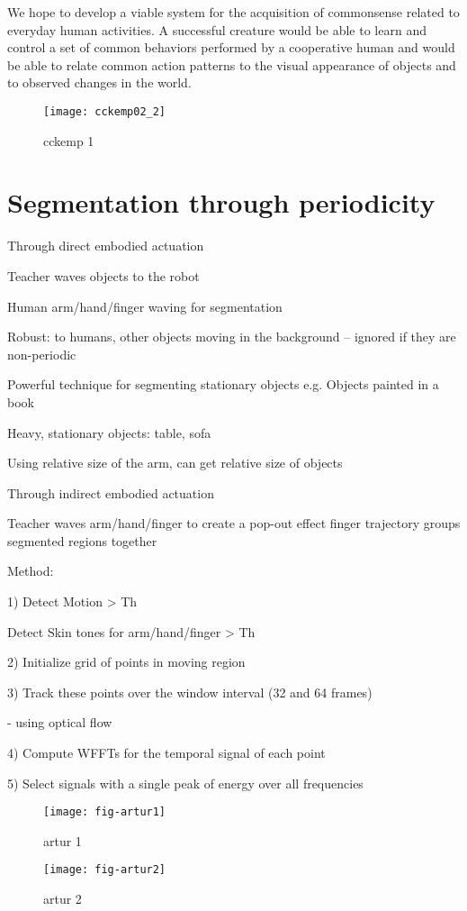 We hope to develop a viable system for the acquisition of commonsense
related to everyday human activities. A successful creature would be
able to learn and control a set of common behaviors performed by a
cooperative human and would be able to relate common action patterns
to the visual appearance of objects and to observed changes in the
world.

\begin{figure}[bt]
\texttt{[image: cckemp02\_2]}
\caption
{
cckemp 1
}
\label{fig:cckemp1}
\end{figure}



\section{Segmentation through periodicity}

Through direct embodied actuation

  Teacher waves objects to the robot

Human arm/hand/finger waving for segmentation

Robust: to humans, other objects moving in the background --
ignored if they are non-periodic

Powerful technique for segmenting stationary objects e.g. Objects
painted in a book

Heavy, stationary objects: table, sofa

Using relative size of the arm, can get relative size of objects

Through indirect embodied actuation

 Teacher waves arm/hand/finger to create a pop-out effect
       finger trajectory groups segmented regions together

Method:

1)  Detect Motion > Th

     Detect Skin tones for arm/hand/finger  > Th

2) Initialize grid of points in moving region

3) Track these points over the window interval (32 and 64 frames)

     - using optical flow

4) Compute WFFTs for the temporal signal of each point

5) Select signals with a single peak of energy over all frequencies 


\begin{figure}[bt]
\texttt{[image: fig-artur1]}
\caption
{
artur 1
}
\label{fig:artur1}
\end{figure}


\begin{figure}[bt]
\texttt{[image: fig-artur2]}
\caption
{
artur 2
}
\label{fig:artur2}
\end{figure}


